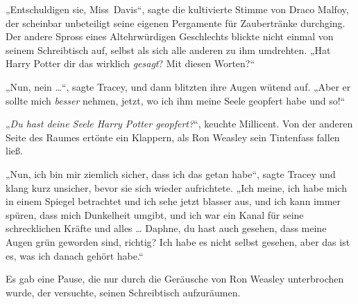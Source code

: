 „Entschuldigen sie, Miss~Davis“, sagte die kultivierte Stimme von Draco Malfoy, der scheinbar unbeteiligt seine eigenen Pergamente für Zaubertränke durchging. Der andere Spross eines Altehrwürdigen Geschlechts blickte nicht einmal von seinem Schreibtisch auf, selbst als sich alle anderen zu ihm umdrehten.
„Hat Harry Potter dir das wirklich \emph{gesagt}? Mit diesen Worten?“

„Nun, nein …“, sagte Tracey, und dann blitzten ihre Augen wütend auf.
„Aber er sollte mich \emph{besser} nehmen, jetzt, wo ich ihm meine Seele geopfert habe und so!“

„\emph{Du hast deine Seele Harry Potter geopfert?}“, keuchte Millicent. Von der anderen Seite des Raumes ertönte ein Klappern, als Ron Weasley sein Tintenfass fallen ließ.

„Nun, ich bin mir ziemlich sicher, dass ich das getan habe“, sagte Tracey und klang kurz unsicher, bevor sie sich wieder aufrichtete.
„Ich meine, ich habe mich in einem Spiegel betrachtet und ich sehe jetzt blasser aus, und ich kann immer spüren, dass mich Dunkelheit umgibt, und ich war ein Kanal für seine schrecklichen Kräfte und alles … Daphne, du hast auch gesehen, dass meine Augen grün geworden sind, richtig? Ich habe es nicht selbst gesehen, aber das ist es, was ich danach gehört habe.“

Es gab eine Pause, die nur durch die Geräusche von Ron Weasley unterbrochen wurde, der versuchte, seinen Schreibtisch aufzuräumen.

